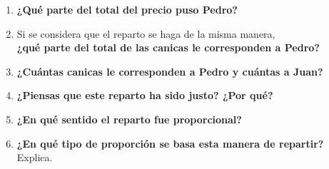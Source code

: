 \documentclass[11pt]{book}
\begin{document}
\begin{enumerate}
        \begin{enumerate}
          \item \textbf{¿Qué parte del total del precio puso Pedro?}\\[1cm]
          \item Si se considera que el reparto se haga de la misma manera,\\
                \textbf{¿qué parte del total de las canicas le corresponden a Pedro?}\\[1cm]
          \item \textbf{¿Cuántas canicas le corresponden a Pedro y cuántas a Juan?}\\[1cm]
          \item \textbf{¿Piensas que este reparto ha sido justo? ¿Por qué?}\\[1cm]
          \item \textbf{¿En qué sentido el reparto fue proporcional?}\\[1cm]
          \item \textbf{¿En qué tipo de proporción se basa esta manera de repartir?} Explica.\\[1cm]
        \end{enumerate}

        \newpage


\end{enumerate}
\end{document}
